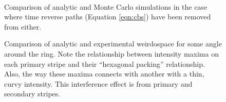 \begin{figure}
\begin{center}
\\
\end{center}
\caption{Comparison of analytic and Monte Carlo simulations in the case
where time reverse paths (Equation \ref{eqn:cbs}) have been removed from
either.}
\label{fig:rtr}
\end{figure}

\begin{figure}
\centering
{}
\caption{Comparison of analytic and experimental weirdospace for some angle
around the ring.  Note the relationship between intensity maxima on each
primary stripe and their ``hexagonal packing'' relationship.  Also, the way
these maxima connects with another with a thin, curvy intensity.  This
interference effect is from primary and secondary stripes.}
\label{fig:hexagonalpacking1}
\end{figure}

